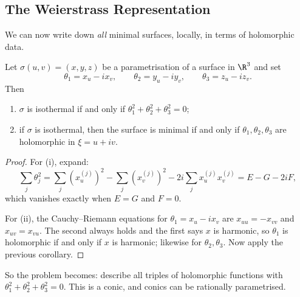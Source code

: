 \subsection{The Weierstrass Representation}

We can now write down \emph{all} minimal surfaces, locally, in terms of holomorphic data.

\begin{proposition}
    Let $\sigma(u,v) = (x, y, z)$ be a parametrisation of a surface in $\R^3$ and set
    $$
    \theta_1 = x_u - i x_v, \qquad \theta_2 = y_u - iy_v, \qquad \theta_3 = z_u - iz_v.
    $$
    Then
    \begin{enumerate}[label=(\roman*)]
        \item $\sigma$ is isothermal if and only if $\theta_1^2+\theta_2^2+\theta_3^2 = 0$;
        \item if $\sigma$ is isothermal, then the surface is minimal if and only if $\theta_1,\theta_2,\theta_3$ are holomorphic in $\xi = u + iv$.
    \end{enumerate}
\end{proposition}
\begin{proof}
    For (i), expand:
    $$
    \sum_j\theta_j^2 = \sum_j\left(x^{(j)}_u\right)^2 - \sum_j\left(x^{(j)}_v\right)^2 - 2i\sum_j x^{(j)}_ux^{(j)}_v = E - G - 2iF,
    $$
    which vanishes exactly when $E = G$ and $F = 0$.

    For (ii), the Cauchy--Riemann equations for $\theta_1 = x_u - ix_v$ are $x_{uu} = -x_{vv}$ and $x_{uv} = x_{vu}$. The second always holds and the first says $x$ is harmonic, so $\theta_1$ is holomorphic if and only if $x$ is harmonic; likewise for $\theta_2,\theta_3$. Now apply the previous corollary.
\end{proof}

So the problem becomes: describe all triples of holomorphic functions with $\theta_1^2+\theta_2^2+\theta_3^2=0$. This is a conic, and conics can be rationally parametrised.

